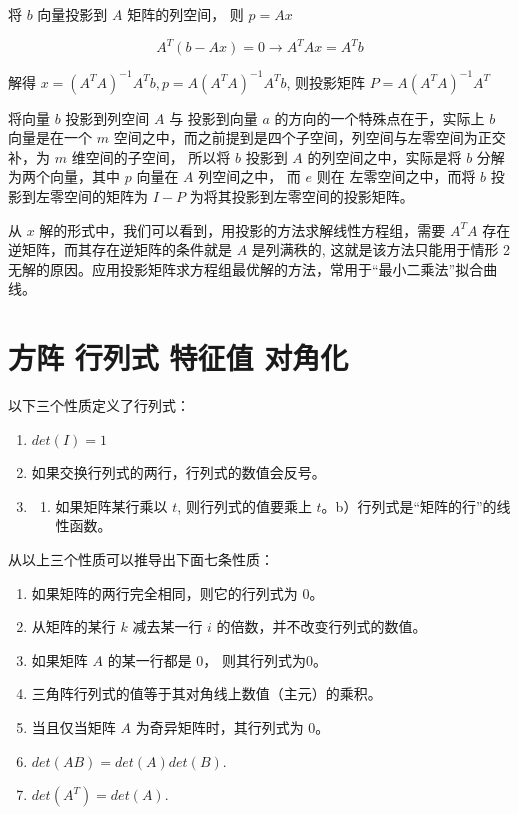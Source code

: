 \documentclass[
  letterpaper,
  DIV=11,
  numbers=noendperiod]{scrartcl}
\providecommand{\tightlist}{%
  \setlength{\itemsep}{0pt}\setlength{\parskip}{0pt}}\usepackage{longtable,booktabs,array}
\begin{document}
将 \(b\) 向量投影到 \(A\) 矩阵的列空间， 则 \(p = Ax\)

\[
A^T(b - Ax) = 0 \rightarrow  A^TAx = A^Tb
\]

解得 \(x = (A^TA)^{-1}A^Tb, p = A(A^TA)^{-1}A^Tb\), 则投影矩阵
\(P = A(A^TA)^{-1}A^T\)

将向量 \(b\) 投影到列空间 \(A\) 与 投影到向量 \(a\)
的方向的一个特殊点在于，实际上 \(b\) 向量是在一个 \(m\)
空间之中，而之前提到是四个子空间，列空间与左零空间为正交补，为 \(m\)
维空间的子空间， 所以将 \(b\) 投影到 \(A\) 的列空间之中，实际是将 \(b\)
分解为两个向量，其中 \(p\) 向量在 \(A\) 列空间之中， 而 \(e\) 则在
左零空间之中，而将 \(b\) 投影到左零空间的矩阵为 \(I-P\)
为将其投影到左零空间的投影矩阵。

从 \(x\) 解的形式中，我们可以看到，用投影的方法求解线性方程组，需要
\(A^TA\) 存在逆矩阵，而其存在逆矩阵的条件就是 \(A\) 是列满秩的,
这就是该方法只能用于情形 2
无解的原因。应用投影矩阵求方程组最优解的方法，常用于``最小二乘法''拟合曲线。

\section{方阵 行列式 特征值
对角化}\label{ux65b9ux9635-ux884cux5217ux5f0f-ux7279ux5f81ux503c-ux5bf9ux89d2ux5316}

以下三个性质定义了行列式：

\begin{enumerate}
\def\labelenumi{\arabic{enumi}.}
\tightlist
\item
  \(det(I) = 1\)
\item
  如果交换行列式的两行，行列式的数值会反号。
\item
  \begin{enumerate}
  \def\labelenumii{\alph{enumii})}
  \tightlist
  \item
    如果矩阵某行乘以 \(t\), 则行列式的值要乘上
    \(t\)。b）行列式是``矩阵的行''的线性函数。
  \end{enumerate}
\end{enumerate}

从以上三个性质可以推导出下面七条性质：

\begin{enumerate}
\def\labelenumi{\arabic{enumi}.}
\setcounter{enumi}{3}
\tightlist
\item
  如果矩阵的两行完全相同，则它的行列式为 0。
\item
  从矩阵的某行 \(k\) 减去某一行 \(i\) 的倍数，并不改变行列式的数值。
\item
  如果矩阵 \(A\) 的某一行都是 0， 则其行列式为0。
\item
  三角阵行列式的值等于其对角线上数值（主元）的乘积。
\item
  当且仅当矩阵 \(A\) 为奇异矩阵时，其行列式为 0。
\item
  \(det(AB) = det(A)det(B)\).
\item
  \(det(A^T) = det(A)\).
\end{enumerate}
\end{document}
